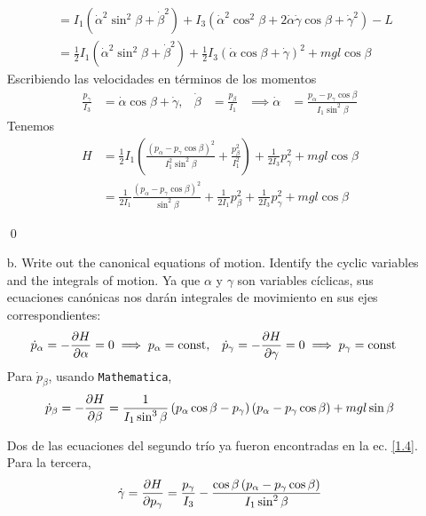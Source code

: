 \documentclass[]{article}
\numberwithin{equation}{section}
\begin{document}
\begin{enumerate}
\begin{align*}
		&= I_1 \left(\dot{\alpha}^2\sin^2\beta + \dot{\beta}^2\right) + I_3 \left(\dot{\alpha}^2\cos^2\beta + 2 \dot{\alpha} \dot{\gamma} \cos\beta +  \dot{\gamma}^2 \right) - L\\
		&= \frac{1}{2} I_1 \left(\dot{\alpha}^2 \sin^2\beta + \dot{\beta}^2 \right) + \frac{1}{2} I_3 \left(\dot{\alpha} \cos\beta + \dot{\gamma}\right)^2 + m g l\cos\beta
	\end{align*}
	Escribiendo las velocidades en términos de los momentos
	\begin{align}
		\frac{p_\gamma}{I_3} &= \dot{\alpha}\cos\beta + \dot{\gamma}, & \dot{\beta} &= \frac{p_\beta}{I_1} & \implies \dot{\alpha} &= \frac{p_\alpha - p_\gamma \cos\beta}{I_1 \sin^2\beta} \label{1.4}
	\end{align}
	Tenemos
	\begin{align}
		H &= \frac{1}{2} I_1 \left(\frac{\left(p_\alpha - p_\gamma \cos\beta\right)^2}{I_1^2 \sin^2\beta} + \frac{p_\beta^2}{I_1^2} \right) + \frac{1}{2 I_3} p_\gamma^2 + m g l\cos\beta\nonumber\\
		&= \frac{1}{2 I_1} \frac{\left(p_\alpha - p_\gamma \cos\beta\right)^2}{\sin^2\beta} + \frac{1}{2 I_1} p_\beta^2 + \frac{1}{2 I_3} p_\gamma^2 + m g l\cos\beta
	\end{align}
	
	\qed
	
	\item[b.] Write out the canonical equations of motion. Identify the cyclic variables and the integrals of motion.
	\resp Ya que $\alpha$ y $\gamma$ son variables cíclicas, sus ecuaciones canónicas nos darán integrales de movimiento en sus ejes correspondientes:
	\begin{align}
		\dot{p}_\alpha &= - \dfrac{\partial H}{\partial \alpha} = 0 \implies p_\alpha = \mathrm{const}, &\dot{p}_\gamma &= - \dfrac{\partial H}{\partial \gamma} = 0 \implies p_\gamma = \mathrm{const}
	\end{align}
	Para $\dot{p}_\beta$, usando \texttt{Mathematica},
	\begin{equation}
		\dot{p}_\beta = - \dfrac{\partial H}{\partial \beta} = \frac{1}{I_1 \sin^3\beta} \left(p_\alpha \cos\beta - p_\gamma\right) \left(p_\alpha - p_\gamma \cos\beta\right) + m g l \sin\beta
	\end{equation}
	
	Dos de las ecuaciones del segundo trío ya fueron encontradas en la ec. \ref{1.4}. Para la tercera,
	\begin{equation}
		\dot{\gamma} = \dfrac{\partial H}{\partial p_\gamma} = \frac{p_\gamma}{I_3} - \frac{\cos\beta \left(p_\alpha - p_\gamma\cos\beta\right)}{I_1 \sin^2\beta}
	\end{equation}
	

\end{enumerate}
\end{document}
